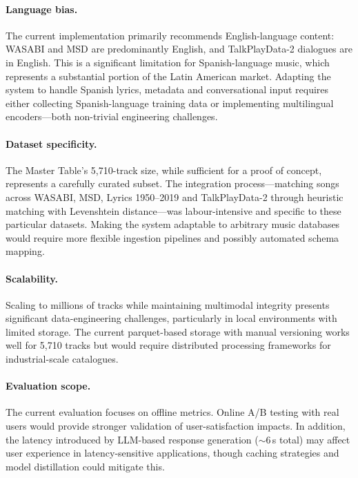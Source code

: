 \documentclass[]{ceurart}
\begin{document}
\paragraph{Language bias.}
The current implementation primarily recommends English-language content: WASABI
and MSD are predominantly English, and TalkPlayData-2 dialogues are in English.
This is a significant limitation for Spanish-language music, which represents a
substantial portion of the Latin American market. Adapting the system to handle
Spanish lyrics, metadata and conversational input requires either collecting
Spanish-language training data or implementing multilingual encoders---both
non-trivial engineering challenges.

\paragraph{Dataset specificity.}
The Master Table's 5,710-track size, while sufficient for a proof of concept,
represents a carefully curated subset. The integration process---matching songs
across WASABI, MSD, Lyrics 1950--2019 and TalkPlayData-2 through heuristic
matching with Levenshtein distance---was labour-intensive and specific to these
particular datasets. Making the system adaptable to arbitrary music databases
would require more flexible ingestion pipelines and possibly automated schema
mapping.

\paragraph{Scalability.}
Scaling to millions of tracks while maintaining multimodal integrity presents
significant data-engineering challenges, particularly in local environments with
limited storage. The current parquet-based storage with manual versioning works
well for 5,710 tracks but would require distributed processing frameworks for
industrial-scale catalogues.

\paragraph{Evaluation scope.}
The current evaluation focuses on offline metrics. Online A/B testing with real
users would provide stronger validation of user-satisfaction impacts. In
addition, the latency introduced by LLM-based response generation
($\sim$6\,s total) may affect user experience in latency-sensitive
applications, though caching strategies and model distillation could mitigate
this.
\end{document}
